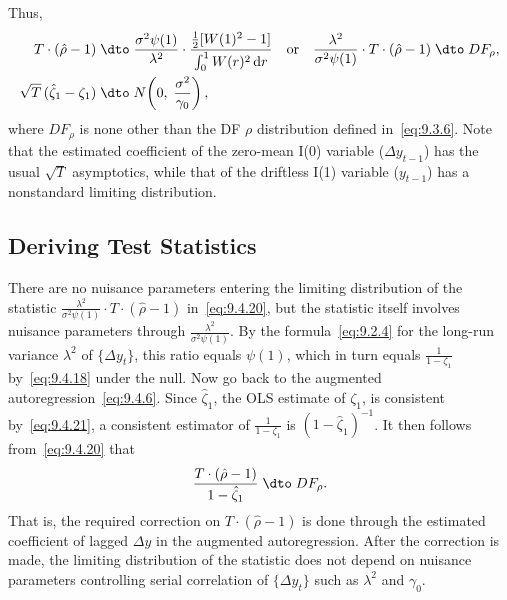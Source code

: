 Thus,
\begin{align}
T \cdot (\hat{\rho} - 1) &\;\dto\;
\frac{\sigma^2 \psi(1)}{\lambda^2} \cdot \frac{\tfrac{1}{2}[W(1)^2 - 1]}{\int_0^1 W(r)^2\,\mathrm{d}r}
\quad\text{or}\quad
\frac{\lambda^2}{\sigma^2 \psi(1)} \cdot T \cdot (\hat{\rho} - 1) \;\dto\; DF_\rho,
\label{eq:9.4.20} \\
\sqrt{T}\,(\hat{\zeta}_1 - \zeta_1) &\;\dto\;
N\!\left(0,\;\frac{\sigma^2}{\gamma_0}\right),
\label{eq:9.4.21}
\end{align}
where $DF_\rho$ is none other than the DF $\rho$ distribution defined in~\eqref{eq:9.3.6}. Note that
the estimated coefficient of the zero-mean I(0) variable ($\Delta y_{t-1}$) has the usual $\sqrt{T}$
asymptotics, while that of the driftless I(1) variable ($y_{t-1}$) has a nonstandard limiting distribution.

\subsection*{Deriving Test Statistics}

There are no nuisance parameters entering the limiting distribution of the statistic
$\frac{\lambda^2}{\sigma^2 \psi(1)} \cdot T \cdot (\hat{\rho} - 1)$ in~\eqref{eq:9.4.20}, but the statistic itself involves nuisance parameters
through $\frac{\lambda^2}{\sigma^2 \psi(1)}$. By the formula~\eqref{eq:9.2.4} for the long-run variance $\lambda^2$ of $\{\Delta y_t\}$, this
ratio equals $\psi(1)$, which in turn equals $\frac{1}{1-\zeta_1}$ by~\eqref{eq:9.4.18} under the null. Now go
back to the augmented autoregression~\eqref{eq:9.4.6}. Since $\hat{\zeta}_1$, the OLS estimate of $\zeta_1$, is
consistent by~\eqref{eq:9.4.21}, a consistent estimator of $\frac{1}{1-\zeta_1}$ is $(1 - \hat{\zeta}_1)^{-1}$. It then follows
from~\eqref{eq:9.4.20} that
\begin{equation}
\label{eq:9.4.22}
\frac{T \cdot (\hat{\rho} - 1)}{1 - \hat{\zeta}_1} \;\dto\; DF_\rho.
\end{equation}
That is, the required correction on $T \cdot (\hat{\rho} - 1)$ is done through the estimated coefficient of lagged $\Delta y$ in the augmented autoregression. After the correction is made,
the limiting distribution of the statistic does not depend on nuisance parameters
controlling serial correlation of $\{\Delta y_t\}$ such as $\lambda^2$ and $\gamma_0$.

